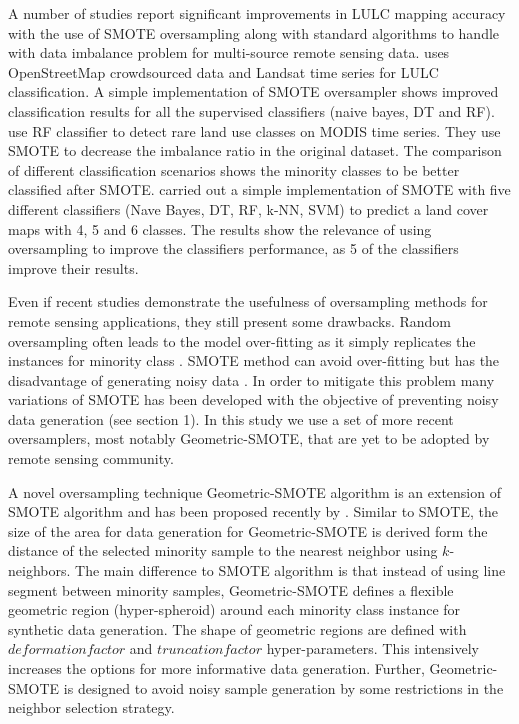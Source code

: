 \documentclass[parskip=full]{scrartcl}
\begin{document}
A number of studies report significant improvements in LULC mapping accuracy
with the use of SMOTE oversampling along with standard algorithms to handle
with data imbalance problem for multi-source remote sensing data.
\cite{Johnson2016} uses OpenStreetMap crowdsourced data and Landsat time series
for LULC classification. A simple implementation of SMOTE oversampler shows
improved classification results for all the supervised classifiers (naive
bayes, DT and RF). \cite{Bogner2018} use RF classifier to detect rare land use
classes on MODIS time series. They use SMOTE to decrease the imbalance ratio
in the original dataset. The comparison of different classification scenarios
shows the minority classes to be better classified after SMOTE.
\cite{Panda2018} carried out a simple implementation of SMOTE with five
different classifiers (Nave Bayes, DT, RF, k-NN, SVM) to predict a land cover
maps with 4, 5 and 6 classes. The results show the relevance of using
oversampling to improve the classifiers performance, as 5 of the classifiers
improve their results.

Even if recent studies demonstrate the usefulness of oversampling methods
for remote sensing applications, they still present some drawbacks. Random
oversampling often leads to the model over-fitting as it simply replicates the
instances for minority class \cite{Feng2019}. SMOTE method can avoid
over-fitting but has the disadvantage of generating noisy data \cite{He2008}.
In order to mitigate this problem many variations of SMOTE has been developed
with the objective of preventing noisy data generation (see section 1). In this
study we use a set of more recent oversamplers, most notably Geometric-SMOTE,
that are yet to be adopted by remote sensing community.

A novel oversampling technique Geometric-SMOTE algorithm is an extension of
SMOTE algorithm and has been proposed recently by \cite{Douzas2019}. Similar to
SMOTE, the size of the area for data generation for Geometric-SMOTE is derived
form the distance of the selected minority sample to the nearest neighbor using
$k$-neighbors. The main difference to SMOTE algorithm is that instead of using
line segment between minority samples, Geometric-SMOTE defines a flexible
geometric region (hyper-spheroid) around each minority class instance for
synthetic data generation. The shape of geometric regions are defined with
$deformation factor$ and $truncation factor$ hyper-parameters. This intensively
increases the options for more informative data generation. Further,
Geometric-SMOTE is designed to avoid noisy sample generation by some
restrictions in the neighbor selection strategy.
\end{document}
